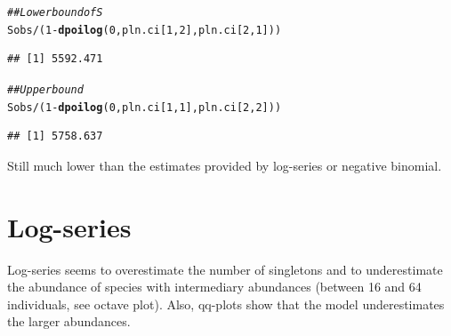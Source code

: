 \documentclass[12pt, A4]{article}\usepackage[]{graphicx}\usepackage[]{color}
\makeatletter
\newcommand{\hlnum}[1]{\textcolor[rgb]{0.686,0.059,0.569}{#1}}%
\newcommand{\hlcom}[1]{\textcolor[rgb]{0.678,0.584,0.686}{\textit{#1}}}%
\newcommand{\hlopt}[1]{\textcolor[rgb]{0,0,0}{#1}}%
\newcommand{\hlstd}[1]{\textcolor[rgb]{0.345,0.345,0.345}{#1}}%
\newcommand{\hlkwd}[1]{\textcolor[rgb]{0.737,0.353,0.396}{\textbf{#1}}}%
\newenvironment{kframe}{%
 \def\at@end@of@kframe{}%
 \ifinner\ifhmode%
  \def\at@end@of@kframe{\end{minipage}}%
  \begin{minipage}{\columnwidth}%
 \fi\fi%
 \def\FrameCommand##1{\hskip\@totalleftmargin \hskip-\fboxsep
 \colorbox{shadecolor}{##1}\hskip-\fboxsep
     \hskip-\linewidth \hskip-\@totalleftmargin \hskip\columnwidth}%
 \MakeFramed {\advance\hsize-\width
   \@totalleftmargin\z@ \linewidth\hsize
   \@setminipage}}%
 {\par\unskip\endMakeFramed%
 \at@end@of@kframe}
\newenvironment{knitrout}{}{} %
\makeatother
\begin{document}
\begin{knitrout}
\color{fgcolor}\begin{kframe}
\begin{alltt}
\hlcom{## Lower bound of S}
\hlstd{Sobs} \hlopt{/} \hlstd{(}\hlnum{1} \hlopt{-} \hlkwd{dpoilog}\hlstd{(}\hlnum{0}\hlstd{, pln.ci[}\hlnum{1}\hlstd{,}\hlnum{2}\hlstd{], pln.ci[}\hlnum{2}\hlstd{,}\hlnum{1}\hlstd{]))}
\end{alltt}
\begin{verbatim}
## [1] 5592.471
\end{verbatim}
\begin{alltt}
\hlcom{## Upper bound}
\hlstd{Sobs} \hlopt{/} \hlstd{(}\hlnum{1} \hlopt{-} \hlkwd{dpoilog}\hlstd{(}\hlnum{0}\hlstd{, pln.ci[}\hlnum{1}\hlstd{,}\hlnum{1}\hlstd{], pln.ci[}\hlnum{2}\hlstd{,}\hlnum{2}\hlstd{]))}
\end{alltt}
\begin{verbatim}
## [1] 5758.637
\end{verbatim}
\end{kframe}
\end{knitrout}

Still much lower than the estimates provided by log-series or negative binomial.

\section*{Log-series}

Log-series seems to overestimate the number of singletons
and to underestimate the abundance of species with intermediary abundances
(between 16 and 64 individuals, see octave plot). Also, qq-plots show that
the model underestimates the larger abundances.
\end{document}
